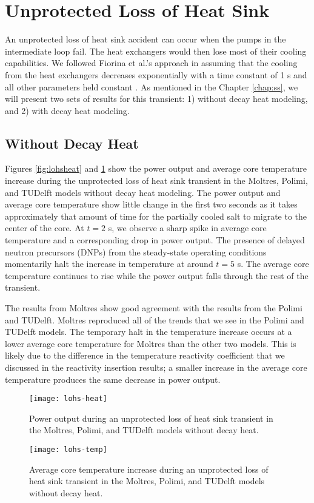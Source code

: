 \clearpage

\section{Unprotected Loss of Heat Sink}

An unprotected loss of heat sink accident can occur when the pumps in the
intermediate loop fail. The heat exchangers would then lose most of their
cooling capabilities. We followed Fiorina et al.'s approach in assuming that
the cooling from the heat exchangers decreases exponentially with a time
constant of 1 s and all other parameters held constant
\cite{fiorina_modelling_2014}. As mentioned in the Chapter \ref{chap:ss}, we
will present two sets of results for this transient: 1) without decay heat
modeling, and 2) with decay heat modeling.

\subsection{Without Decay Heat}

Figures \ref{fig:lohsheat} and \ref{fig:lohstemp} show the power output and
average core temperature increase during the unprotected loss of heat sink
transient in the Moltres, Polimi, and TUDelft models without decay heat
modeling. The power output and average core temperature show little change in
the first two seconds as it takes approximately that amount of time for the
partially cooled salt to migrate to the center of the core. At $t=2$ s, we
observe a sharp spike in average core temperature and a corresponding drop
in power output. The presence of delayed neutron precursors (DNPs) from the
steady-state operating conditions momentarily halt the increase in temperature
at around $t=5$ s. The average core temperature continues to rise while the
power output falls through the rest of the transient.

The results from Moltres show good agreement with the results from the Polimi
and TUDelft. Moltres reproduced all of the trends that we see in the Polimi
and TUDelft models. The temporary halt in the temperature increase occurs at
a lower average core temperature for Moltres than the other two models. This
is likely due to the difference in the temperature reactivity coefficient
that we discussed in the reactivity insertion results; a smaller increase in
the average core temperature produces the same decrease in power output.

\begin{figure}[htbp!]
    \centering
    \texttt{[image: lohs-heat]}
    \caption{Power output during
    an unprotected loss of heat sink transient in the Moltres, Polimi, and
    TUDelft models \cite{fiorina_modelling_2014} without decay heat.}
    \label{fig:lohsheat}
    \texttt{[image: lohs-temp]}
    \caption{Average core temperature increase during
    an unprotected loss of heat sink transient in the Moltres, Polimi, and
    TUDelft models \cite{fiorina_modelling_2014} without decay heat.}
    \label{fig:lohstemp}
\end{figure}

